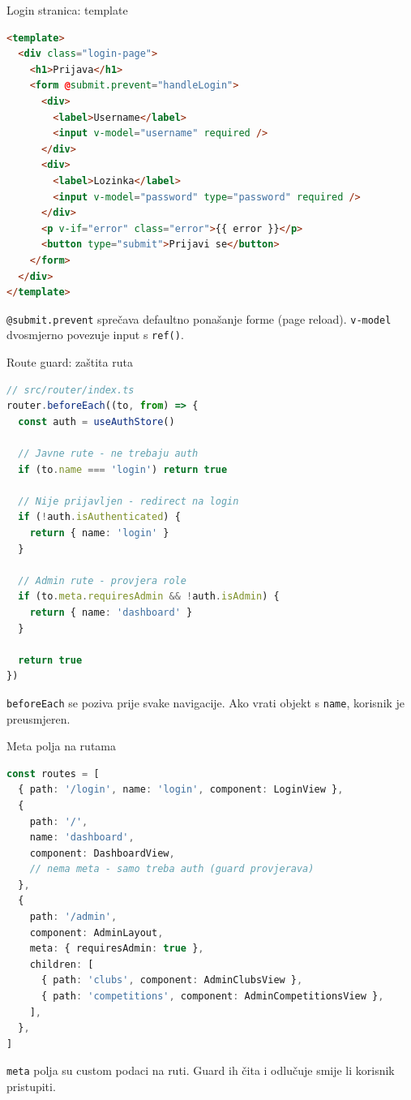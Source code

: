 \begin{frame}[fragile,shrink=5]{Login stranica: template}
\begin{lstlisting}[language=html]
<template>
  <div class="login-page">
    <h1>Prijava</h1>
    <form @submit.prevent="handleLogin">
      <div>
        <label>Username</label>
        <input v-model="username" required />
      </div>
      <div>
        <label>Lozinka</label>
        <input v-model="password" type="password" required />
      </div>
      <p v-if="error" class="error">{{ error }}</p>
      <button type="submit">Prijavi se</button>
    </form>
  </div>
</template>
\end{lstlisting}

\vspace{0.4em}
\texttt{@submit.prevent} sprečava defaultno ponašanje forme (page reload). \texttt{v-model} dvosmjerno povezuje input s \texttt{ref()}.
\end{frame}

\begin{frame}[fragile,shrink=5]{Route guard: zaštita ruta}
\begin{lstlisting}[language=typescript]
// src/router/index.ts
router.beforeEach((to, from) => {
  const auth = useAuthStore()

  // Javne rute - ne trebaju auth
  if (to.name === 'login') return true

  // Nije prijavljen - redirect na login
  if (!auth.isAuthenticated) {
    return { name: 'login' }
  }

  // Admin rute - provjera role
  if (to.meta.requiresAdmin && !auth.isAdmin) {
    return { name: 'dashboard' }
  }

  return true
})
\end{lstlisting}

\vspace{0.4em}
\texttt{beforeEach} se poziva prije svake navigacije. Ako vrati objekt s \texttt{name}, korisnik je preusmjeren.
\end{frame}

\begin{frame}[fragile,shrink=5]{Meta polja na rutama}
\begin{lstlisting}[language=typescript]
const routes = [
  { path: '/login', name: 'login', component: LoginView },
  {
    path: '/',
    name: 'dashboard',
    component: DashboardView,
    // nema meta - samo treba auth (guard provjerava)
  },
  {
    path: '/admin',
    component: AdminLayout,
    meta: { requiresAdmin: true },
    children: [
      { path: 'clubs', component: AdminClubsView },
      { path: 'competitions', component: AdminCompetitionsView },
    ],
  },
]
\end{lstlisting}

\vspace{0.4em}
\texttt{meta} polja su custom podaci na ruti. Guard ih čita i odlučuje smije li korisnik pristupiti.
\end{frame}

